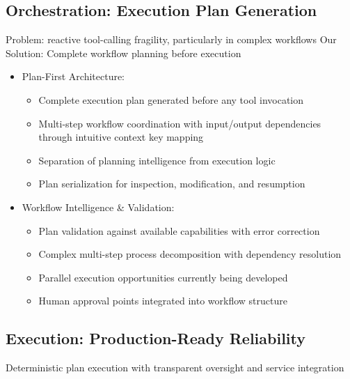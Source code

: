 \subsection{Orchestration: Execution Plan Generation}
\label{sec:orchestration}
Problem: reactive tool-calling fragility, particularly in complex workflows
Our Solution: Complete workflow planning before execution
\begin{itemize}
    \item Plan-First Architecture:
    \begin{itemize}
        \item Complete execution plan generated before any tool invocation
        \item Multi-step workflow coordination with input/output dependencies through intuitive context key mapping
        \item Separation of planning intelligence from execution logic
        \item Plan serialization for inspection, modification, and resumption
    \end{itemize}
    \item Workflow Intelligence & Validation:
    \begin{itemize}
        \item Plan validation against available capabilities with error correction
        \item Complex multi-step process decomposition with dependency resolution
        \item Parallel execution opportunities currently being developed
        \item Human approval points integrated into workflow structure
    \end{itemize}
\end{itemize}


\subsection{Execution: Production-Ready Reliability}
\label{sec:execution}

Deterministic plan execution with transparent oversight and service integration

